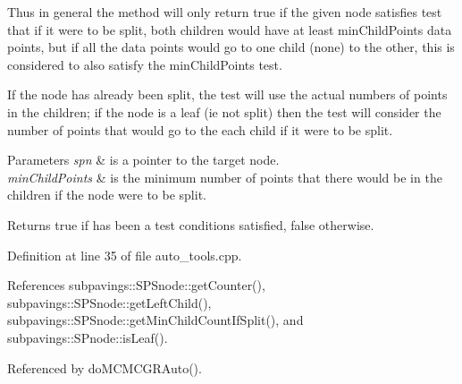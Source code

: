 \-Thus in general the method will only return true if the given node satisfies test that if it were to be split, both children would have at least min\-Child\-Points data points, but if all the data points would go to one child (none) to the other, this is considered to also satisfy the min\-Child\-Points test.

\-If the node has already been split, the test will use the actual numbers of points in the children; if the node is a leaf (ie not split) then the test will consider the number of points that would go to the each child if it were to be split.


\begin{DoxyParams}{\-Parameters}
{\em spn} & is a pointer to the target node. \\
\hline
{\em min\-Child\-Points} & is the minimum number of points that there would be in the children if the node were to be split. \\
\hline
\end{DoxyParams}
\begin{DoxyReturn}{\-Returns}
true if has been a test conditions satisfied, false otherwise. 
\end{DoxyReturn}


\-Definition at line 35 of file auto\-\_\-tools.\-cpp.



\-References subpavings\-::\-S\-P\-Snode\-::get\-Counter(), subpavings\-::\-S\-P\-Snode\-::get\-Left\-Child(), subpavings\-::\-S\-P\-Snode\-::get\-Min\-Child\-Count\-If\-Split(), and subpavings\-::\-S\-Pnode\-::is\-Leaf().



\-Referenced by do\-M\-C\-M\-C\-G\-R\-Auto().



